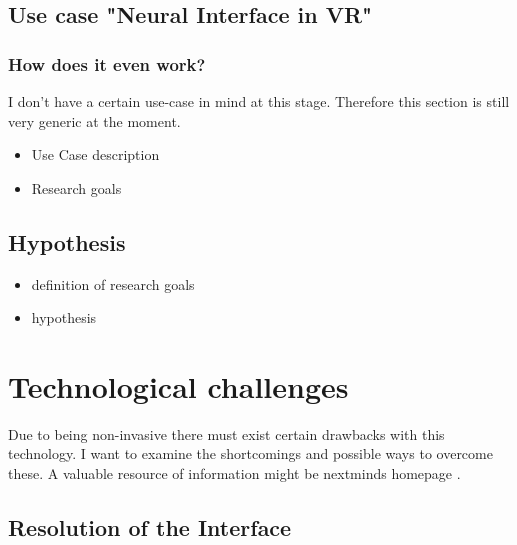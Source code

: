         \section{Use case "Neural Interface in VR"}

            \subsection{How does it even work?}\label{working-principle}


            I don't have a certain use-case in mind at this stage. Therefore this section is still very generic at the moment.

            \begin{itemize}
                \item Use Case description
                \item Research goals
            \end{itemize}        

        \section{Hypothesis}

            \begin{itemize}
                \item definition of research goals
                \item hypothesis
            \end{itemize}

    \chapter{Technological challenges}

        Due to being non-invasive there must exist certain drawbacks with this technology. I want to examine the shortcomings and possible ways to overcome these.    
        A valuable resource of information might be nextminds homepage \cite{NextMind.}.

        \section{Resolution of the Interface}

